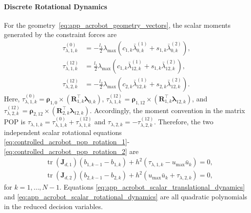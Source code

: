 \paragraph{Discrete Rotational Dynamics}

For the geometry~\eqref{eq:app_acrobot_geometry_vectors}, the scalar moments
generated by the constraint forces are
\begin{subequations}
\label{eq:app_acrobot_scalar_constraint_moments}
\begin{align}
\tau_{\lambda,1,k}^{(0)}
&=-\frac{l_1}{2}
  \lambda_{\max}\left(c_{1,k}\bar\lambda_{0,k}^{(1)}
       +s_{1,k}\bar\lambda_{0,k}^{(2)}\right),
\label{eq:app_acrobot_tau_lambda_10}\\
\tau_{\lambda,1,k}^{(12)}
&=\frac{l_1}{2}
  \lambda_{\max}\left(c_{1,k}\bar\lambda_{12,k}^{(1)}
       +s_{1,k}\bar\lambda_{12,k}^{(2)}\right),
\label{eq:app_acrobot_tau_lambda_112}\\
\tau_{\lambda,2,k}^{(12)}
&=-\frac{l_2}{2}
  \lambda_{\max}\left(c_{2,k}\bar\lambda_{12,k}^{(1)}
       +s_{2,k}\bar\lambda_{12,k}^{(2)}\right).
\label{eq:app_acrobot_tau_lambda_212}
\end{align}
\end{subequations}
Here,
\(\tau_{\lambda,1,k}^{(0)}=\bm{\rho}_{1,0}\times
(\bm{R}_{1,k}^{\top}\bm{\lambda}_{0,k})\),
\(\tau_{\lambda,1,k}^{(12)}=\bm{\rho}_{1,12}\times
(\bm{R}_{1,k}^{\top}\bm{\lambda}_{12,k})\), and
\(\tau_{\lambda,2,k}^{(12)}=\bm{\rho}_{2,12}\times
(\bm{R}_{2,k}^{\top}\bm{\lambda}_{12,k})\).
Accordingly, the moment convention in the matrix POP is
$\tau_{\lambda,1,k}=\tau_{\lambda,1,k}^{(0)}+\tau_{\lambda,1,k}^{(12)}$ and
$\tau_{\lambda,2,k}=-\tau_{\lambda,2,k}^{(12)}$.
Therefore, the two independent scalar rotational equations \eqref{eq:controlled_acrobot_pop_rotation_1}-\eqref{eq:controlled_acrobot_pop_rotation_2} are
\begin{subequations}
\label{eq:app_acrobot_scalar_rotational_dynamics}
\begin{align}
&\operatorname{tr}(\bm{J}_{d,1})(b_{1,k-1}-b_{1,k})
+h^2\left(
\tau_{\lambda,1,k}-u_{\max}\bar u_k
\right)=0,
\label{eq:app_acrobot_rotation_1}\\
&\operatorname{tr}(\bm{J}_{d,2})(b_{2,k-1}-b_{2,k})
+h^2\left(
u_{\max}\bar u_k+\tau_{\lambda,2,k}
\right)=0,
\label{eq:app_acrobot_rotation_2}
\end{align}
\end{subequations}
for $k=1,\ldots,N-1$. Equations
\eqref{eq:app_acrobot_scalar_translational_dynamics} and
\eqref{eq:app_acrobot_scalar_rotational_dynamics} are all quadratic
polynomials in the reduced decision variables.

